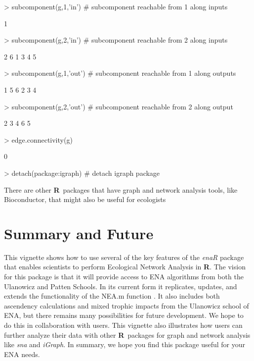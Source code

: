 \documentclass[article]{jss}
\newcommand{\R}{\textbf{R}}
\begin{document}
\begin{Schunk}
\begin{Sinput}
> subcomponent(g,1,'in')  # subcomponent reachable from 1 along inputs
\end{Sinput}
\begin{Soutput}
[1] 1
\end{Soutput}
\begin{Sinput}
> subcomponent(g,2,'in')  # subcomponent reachable from 2 along inputs
\end{Sinput}
\begin{Soutput}
[1] 2 6 1 3 4 5
\end{Soutput}
\begin{Sinput}
> subcomponent(g,1,'out') # subcomponent reachable from 1 along outputs
\end{Sinput}
\begin{Soutput}
[1] 1 5 6 2 3 4
\end{Soutput}
\begin{Sinput}
> subcomponent(g,2,'out') # subcomponent reachable from 2 along output
\end{Sinput}
\begin{Soutput}
[1] 2 3 4 6 5
\end{Soutput}
\begin{Sinput}
> edge.connectivity(g)
\end{Sinput}
\begin{Soutput}
[1] 0
\end{Soutput}
\begin{Sinput}
> detach(package:igraph)  # detach igraph package
\end{Sinput}
\end{Schunk}



There are other \R\ packages that have graph and network analysis tools,
like Bioconductor, that might also be useful for ecologists


\section{Summary and Future}
This vignette shows how to use several of the key features of the
\textit{enaR} package that enables scientists to perform Ecological
Network Analysis in \R.  The vision for this package is that it will
provide access to ENA algorithms from both the Ulanowicz and Patten
Schools.  In its current form it replicates, updates, and extends the
functionality of the NEA.m function \citep{fath06}.  It also includes
both ascendency calculations and mixed trophic impacts from the
Ulanowicz school of ENA, but there remains many possibilities for
future development.  We hope to do this in collaboration with
users. This vignette also illustrates how users can further analyze
their data with other \R\ packages for graph and network analysis like
\textit{sna} and \textit{iGraph}.  In summary, we hope you find this
package useful for your ENA needs.



\end{document}
